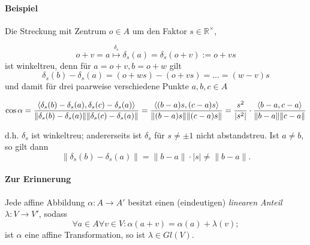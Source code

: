 \paragraph{Beispiel}
	Die Streckung mit Zentrum $ o\in A $ um den Faktor $ s\in \mathbb{R}^\times $,
	
	\begin{minipage}[t]{0.55\linewidth}
		\[ o+v=a\overset{\delta_s}{\mapsto}\delta_s(a) = \delta_s(o+v):= o+vs \]
	ist winkeltreu, denn für $ a=o+v, b=o+w $ gilt
		\[ \delta_s(b)-\delta_s(a) = (o+ws)-(o+vs) = \dots = (w-v)s \]
	und damit für drei paarweise verschiedene Punkte $ a,b,c\in A $
\end{minipage}
\hfill
\begin{minipage}[t]{0.4\linewidth}
 	\begin{figure}[H]\centering
 		
	\end{figure}
\end{minipage}

		\[ \cos \alpha = \frac{\langle \delta_s(b)-\delta_s(a),\delta_s(c)-\delta_s(a) \rangle}{\|\delta_s(b)-\delta_s(a)\|\|\delta_s(c)-\delta_s(a)\|} = \frac{\langle (b-a)s,(c-a)s \rangle}{\|(b-a)s\|\|(c-a)s\|} =\frac{s^2}{|s^2|} \cdot \frac{\langle b-a,c-a \rangle}{\|b-a\|\|c-a\|} \]
		
\begin{minipage}[t]{0.5\linewidth}
    \vspace{2cm}
	d.h. $ \delta_s $ ist winkeltreu; andererseits ist $ \delta_s $ für $ s\neq \pm 1 $ nicht abstandstreu.
	Ist $ a \neq b $, so gilt dann
		\[ \|\delta_s(b)-\delta_s(a)\| = \|b-a\|\cdot |s| \neq \|b-a\|. \] 
\end{minipage}
\hfill
\begin{minipage}[t]{0.45\linewidth}
 	\begin{figure}[H]\centering
 		
	\end{figure}
\end{minipage}		

\paragraph{Zur Erinnerung}
	Jede affine Abbildung $ \alpha:A\to A' $ besitzt einen (eindeutigen) \emph{linearen Anteil} $ \lambda:V\to V' $, sodass
		\[ \forall a\in A\forall v\in V: \alpha(a+v) = \alpha(a)+\lambda(v); \]
	ist $ \alpha $ eine affine Transformation, so ist $ \lambda \in Gl(V) $.
